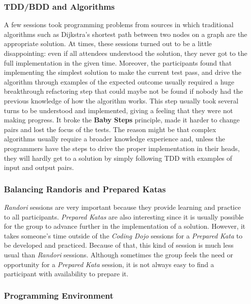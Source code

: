 \subsubsection{TDD/BDD and Algorithms}

A few sessions took programming problems from sources in which
traditional algorithms such as Dijkstra's shortest path between two
nodes on a graph are the appropriate solution. At times,
these sessions turned out to be a little disappointing: even if all attendees
understood the solution, they never got to the full implementation in the given
time. Moreover, the participants found that implementing the simplest solution
to make the current test pass, and drive the algorithm through examples of the
expected outcome usually required a huge breakthrough refactoring step that could
maybe not be found if nobody had the previous knowledge of how the
algorithm works. This step usually took several turns to be understood and implemented,
giving a feeling that they were not making progress. It broke the \textbf{Baby Steps}
principle, made it harder to change pairs and lost the focus of the tests.
The reason might be that complex algorithms usually require a broader knowledge
experience and, unless the programmers have the steps to drive the proper implementation
in their heads, they will hardly get to a solution by simply following TDD with examples
of input and output pairs.

\subsubsection{Balancing Randoris and Prepared Katas}

\emph{Randori} sessions are very important because they provide
learning and practice to all participants. \emph{Prepared Katas} are
also interesting since it is usually possible for the group to advance
further in the implementation of a solution. However, it takes
someone's time outside of the \emph{Coding Dojo} sessions for a
\emph{Prepared Kata} to be developed and practiced. Because of that,
this kind of session is much less usual than \emph{Randori} sessions.
Although sometimes the group feels the need or opportunity for a
\emph{Prepared Kata} session, it is not always easy to find a participant
with availability to prepare it.

\subsubsection{Programming Environment}

